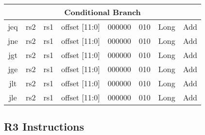 \documentclass{article}
\begin{document}
\begin{center}
\begin{longtable}{|c|l|r|l|r|l|r|l|r|l|r|c|c|}
                        \multicolumn{13}{|c|}{Conditional Branch} \\
    \hline jeq      &   \multicolumn{2}{|c|}{rs2}   &   \multicolumn{2}{|c|}{rs1}   &   \multicolumn{2}{|c|}{offset [11:0]} &   \multicolumn{2}{|c|}{000000}    &   \multicolumn{2}{|c|}{010}   &   Long    &   Add \\
    \hline jne      &   \multicolumn{2}{|c|}{rs2}   &   \multicolumn{2}{|c|}{rs1}   &   \multicolumn{2}{|c|}{offset [11:0]} &   \multicolumn{2}{|c|}{000000}    &   \multicolumn{2}{|c|}{010}   &   Long    &   Add \\
    \hline jgt      &   \multicolumn{2}{|c|}{rs2}   &   \multicolumn{2}{|c|}{rs1}   &   \multicolumn{2}{|c|}{offset [11:0]} &   \multicolumn{2}{|c|}{000000}    &   \multicolumn{2}{|c|}{010}   &   Long    &   Add \\
    \hline jge      &   \multicolumn{2}{|c|}{rs2}   &   \multicolumn{2}{|c|}{rs1}   &   \multicolumn{2}{|c|}{offset [11:0]} &   \multicolumn{2}{|c|}{000000}    &   \multicolumn{2}{|c|}{010}   &   Long    &   Add \\
    \hline jlt      &   \multicolumn{2}{|c|}{rs2}   &   \multicolumn{2}{|c|}{rs1}   &   \multicolumn{2}{|c|}{offset [11:0]} &   \multicolumn{2}{|c|}{000000}    &   \multicolumn{2}{|c|}{010}   &   Long    &   Add \\
    \hline jle      &   \multicolumn{2}{|c|}{rs2}   &   \multicolumn{2}{|c|}{rs1}   &   \multicolumn{2}{|c|}{offset [11:0]} &   \multicolumn{2}{|c|}{000000}    &   \multicolumn{2}{|c|}{010}   &   Long    &   Add \\
    
            
    \hline
    \end{longtable}
    \end{center}
    
    
    \subsection{R3 Instructions}
    
\end{document}
